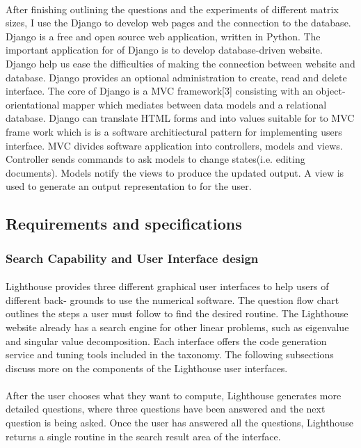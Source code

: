 \documentclass[pdftex,12pt,a4paper]{article}
\begin{document}
\paragraph{}
After finishing outlining the questions and the experiments of different matrix sizes, I use the Django to develop web pages and the connection to the database. Django is a free and open source web application, written in Python. The important application for of Django is to develop database-driven website. Django help us ease the difficulties of making the connection between website and database. Django provides an optional administration  to create, read and delete interface. The core of Django is a MVC framework[3] consisting with an object-orientational mapper which mediates between data models and a relational database. Django can translate HTML forms and into values suitable for to MVC frame work which is is  a software architiectural pattern for implementing users interface. MVC divides software application into controllers, models and views. Controller sends commands to ask models to change states(i.e. editing documents). Models notify the views to produce the updated output. A view is used to generate an output representation to for the user.    

\subsection{Requirements and specifications}
\subsubsection{Search Capability and User Interface design}
\paragraph{}
Lighthouse provides three different graphical user interfaces to help users of different back- grounds to use the numerical software. 
The question flow chart outlines the steps a user must follow to find the desired routine. The Lighthouse website already has a search engine for other linear problems, such as eigenvalue and singular value decomposition. Each interface offers the code generation service and tuning tools included in the taxonomy. The following subsections discuss more on the components of the Lighthouse user interfaces. 

\paragraph{}
After the user chooses what they want to compute, Lighthouse generates more detailed questions, where three questions have been answered and the next question is being asked. Once the user has answered all the questions, Lighthouse returns a single routine in the search result area of the interface.
\end{document}
